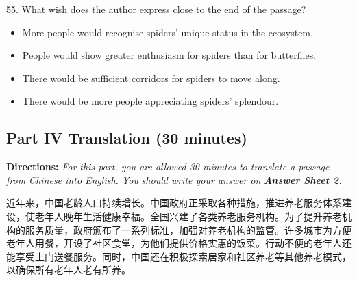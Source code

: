\documentclass[UTF8,11pt]{ctexart}
\begin{document}
55. What wish does the author express close to the end of the passage?


\begin{itemize}[leftmargin=2em,itemsep=.2em,topsep=.4em]\item[A.] More people would recognise spiders’ unique status in the ecosystem.
\item[B.] People would show greater enthusiasm for spiders than for butterflies.
\item[C.] There would be sufficient corridors for spiders to move along.
\item[D.] There would be more people appreciating spiders’ splendour.
\end{itemize}

\subsection*{\textbf{Part IV Translation} \textbf{(30 minutes)}}


\textbf{Directions: }\textit{For this part, you are allowed 30 minutes to translate a passage from Chinese into English. You} \textit{should write your answer on }\textbf{\textit{Answer Sheet 2}}\textit{.}


近年来，中国老龄人口持续增长。中国政府正采取各种措施，推进养老服务体系建设，使老年人晚年生活健康幸福。全国兴建了各类养老服务机构。为了提升养老机构的服务质量，政府颁布了一系列标准，加强对养老机构的监管。许多城市为方便老年人用餐，开设了社区食堂，为他们提供价格实惠的饭菜。行动不便的老年人还能享受上门送餐服务。同时，中国还在积极探索居家和社区养老等其他养老模式，以确保所有老年人老有所养。
\end{document}
